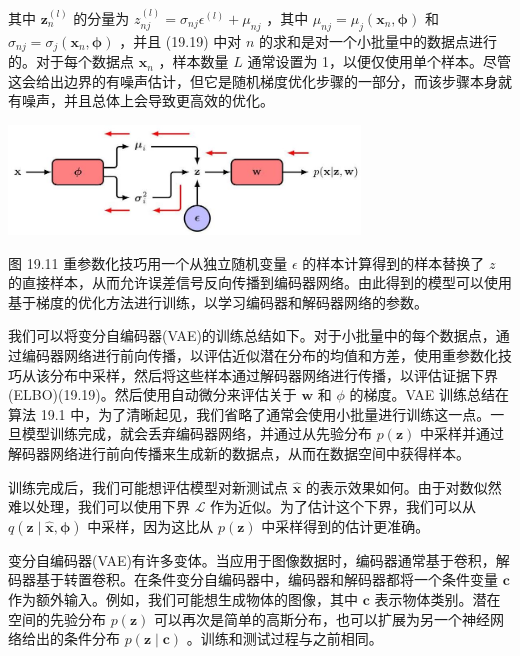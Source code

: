 \documentclass[10pt]{report}
\begin{document}
其中 \({\mathbf{z}}_{n}^{\left( l\right) }\) 的分量为 \({z}_{nj}^{\left( l\right) } = {\sigma }_{nj}{\epsilon }^{\left( l\right) } + {\mu }_{nj}\) ，其中 \({\mu }_{nj} = {\mu }_{j}\left( {{\mathbf{x}}_{n},\mathbf{\phi }}\right)\) 和 \({\sigma }_{nj} = {\sigma }_{j}\left( {{\mathbf{x}}_{n},\mathbf{\phi }}\right)\) ，并且 (19.19) 中对 \(n\) 的求和是对一个小批量中的数据点进行的。对于每个数据点 \({\mathbf{x}}_{n}\) ，样本数量 \(L\) 通常设置为 1，以便仅使用单个样本。尽管这会给出边界的有噪声估计，但它是随机梯度优化步骤的一部分，而该步骤本身就有噪声，并且总体上会导致更高效的优化。

\begin{center}
\includegraphics[max width=0.7\textwidth]{images/0194e279-9b28-703a-88f4-c3ac21e2010d_595_595_337_874_273_0.jpg}
\end{center}
\hspace*{3em} 

图 19.11 重参数化技巧用一个从独立随机变量 \(\epsilon\) 的样本计算得到的样本替换了 \(z\) 的直接样本，从而允许误差信号反向传播到编码器网络。由此得到的模型可以使用基于梯度的优化方法进行训练，以学习编码器和解码器网络的参数。

我们可以将变分自编码器(VAE)的训练总结如下。对于小批量中的每个数据点，通过编码器网络进行前向传播，以评估近似潜在分布的均值和方差，使用重参数化技巧从该分布中采样，然后将这些样本通过解码器网络进行传播，以评估证据下界(ELBO)(19.19)。然后使用自动微分来评估关于 \(\mathbf{w}\) 和 \(\phi\) 的梯度。VAE 训练总结在算法 19.1 中，为了清晰起见，我们省略了通常会使用小批量进行训练这一点。一旦模型训练完成，就会丢弃编码器网络，并通过从先验分布 \(p\left( \mathbf{z}\right)\) 中采样并通过解码器网络进行前向传播来生成新的数据点，从而在数据空间中获得样本。

训练完成后，我们可能想评估模型对新测试点 \(\widehat{\mathbf{x}}\) 的表示效果如何。由于对数似然难以处理，我们可以使用下界 \(\mathcal{L}\) 作为近似。为了估计这个下界，我们可以从 \(q\left( {\mathbf{z} \mid  \widehat{\mathbf{x}},\mathbf{\phi }}\right)\) 中采样，因为这比从 \(p\left( \mathbf{z}\right)\) 中采样得到的估计更准确。

变分自编码器(VAE)有许多变体。当应用于图像数据时，编码器通常基于卷积，解码器基于转置卷积。在条件变分自编码器中，编码器和解码器都将一个条件变量 \(\mathbf{c}\) 作为额外输入。例如，我们可能想生成物体的图像，其中 \(\mathbf{c}\) 表示物体类别。潜在空间的先验分布 \(p\left( \mathbf{z}\right)\) 可以再次是简单的高斯分布，也可以扩展为另一个神经网络给出的条件分布 \(p\left( {\mathbf{z} \mid  \mathbf{c}}\right)\) 。训练和测试过程与之前相同。
\end{document}
